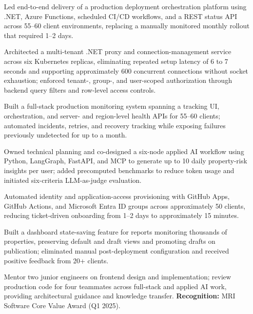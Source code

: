 \resumeItemListStart
    \item{Led end-to-end delivery of a production deployment orchestration platform using .NET, Azure Functions, scheduled CI/CD workflows, and a REST status API across 55--60 client environments, replacing a manually monitored monthly rollout that required 1--2 days.}
    \item{Architected a multi-tenant .NET proxy and connection-management service across six Kubernetes replicas, eliminating repeated setup latency of 6 to 7 seconds and supporting approximately 600 concurrent connections without socket exhaustion; enforced tenant-, group-, and user-scoped authorization through backend query filters and row-level access controls.}
    \item{Built a full-stack production monitoring system spanning a tracking UI, orchestration, and server- and region-level health APIs for 55--60 clients; automated incidents, retries, and recovery tracking while exposing failures previously undetected for up to a month.}
    \item{Owned technical planning and co-designed a six-node applied AI workflow using Python, LangGraph, FastAPI, and MCP to generate up to 10 daily property-risk insights per user; added precomputed benchmarks to reduce token usage and initiated six-criteria LLM-as-judge evaluation.}
    \item{Automated identity and application-access provisioning with GitHub Apps, GitHub Actions, and Microsoft Entra ID groups across approximately 50 clients, reducing ticket-driven onboarding from 1--2 days to approximately 15 minutes.}
    \item{Built a dashboard state-saving feature for reports monitoring thousands of properties, preserving default and draft views and promoting drafts on publication; eliminated manual post-deployment configuration and received positive feedback from 20+ clients.}
    \item{Mentor two junior engineers on frontend design and implementation; review production code for four teammates across full-stack and applied AI work, providing architectural guidance and knowledge transfer.}
\resumeItemListEnd
\noindent\hspace{3ex}\small{\textbf{Recognition:} MRI Software Core Value Award (Q1 2025).}
